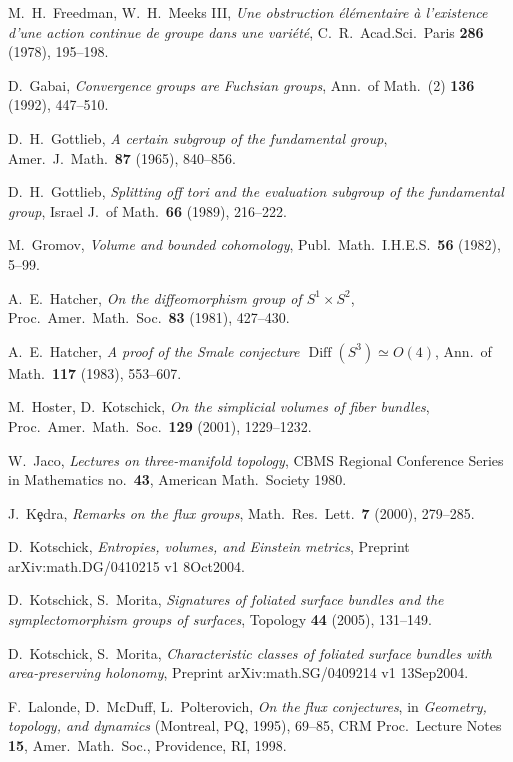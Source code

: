\documentclass[12pt]{amsart}
\theoremstyle{definition}
\theoremstyle{remark}
\newcommand\Diff{\operatorname{Diff}}
\begin{document}
\begin{thebibliography}{999}
M.~H.~Freedman, W.~H.~Meeks III,
{\it Une obstruction \'el\'ementaire \`a l'existence d'une action continue de groupe dans une vari\'et\'e},
C.~R.~Acad.Sci.~Paris {\bf 286} (1978), 195--198.

D.~Gabai, 
{\it Convergence groups are Fuchsian groups},
Ann.~of Math.~(2) {\bf 136} (1992), 447--510.

D.~H.~Gottlieb,
{\it A certain subgroup of the fundamental group},
Amer.~J.~Math.~{\bf 87} (1965), 840--856.

D.~H.~Gottlieb,
{\it Splitting off tori and the evaluation subgroup of the 
fundamental group},
Israel J.~of Math.~{\bf 66} (1989), 216--222.

M.~Gromov, {\it Volume and bounded cohomology}, 
Publ.~Math.~I.H.E.S.~{\bf 56} (1982), 5--99.

A.~E.~Hatcher, {\it On the diffeomorphism group of $S^1\times S^2$}, 
Proc.~Amer.~Math.~Soc.~{\bf 83} (1981), 427--430.

A.~E.~Hatcher, {\it A proof of the Smale conjecture $\Diff (S^3)\simeq O(4)$}, 
Ann.~of Math.~{\bf 117} (1983), 553--607.

M.~Hoster, D.~Kotschick,
{\it On the simplicial volumes of fiber bundles},
Proc.~Amer.~Math.~Soc.~{\bf 129} (2001), 1229--1232.

W.~Jaco,
{\sl Lectures on three-manifold topology},
CBMS Regional Conference Series in Mathematics no.~{\bf 43}, American 
Math.~Society 1980.

J.~K\c edra,
{\it Remarks on the flux groups},
Math.~Res.~Lett.~{\bf 7} (2000), 279--285.
 
D.~Kotschick, {\it Entropies, volumes, and Einstein metrics}, Preprint arXiv:math.DG/0410215 
v1 8Oct2004.

D.~Kotschick, S.~Morita,
{\it Signatures of foliated surface bundles and the symplectomorphism 
groups of surfaces}, Topology {\bf 44} (2005), 131--149. 

D.~Kotschick, S.~Morita,
{\it Characteristic classes of foliated surface bundles with area-preserving  holonomy}, 
Preprint arXiv:math.SG/0409214 v1 13Sep2004.

F.~Lalonde, D.~McDuff, L.~Polterovich,
{\it On the flux conjectures}, in {\sl Geometry, topology, and dynamics} 
(Montreal, PQ, 1995),  69--85, CRM Proc.~Lecture Notes {\bf 15}, 
Amer.~Math.~Soc., Providence, RI, 1998.


\end{thebibliography}
\end{document}

